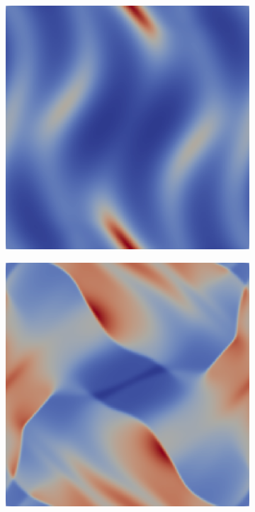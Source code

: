 \documentclass[a4paper]{article}
\begin{document}
\begin{figure}[h]
  \centering
  \begin{subfigure}[b]{0.49\textwidth}
    \centering
    \includegraphics[width=\textwidth]{results/orszag_tang05}
  \end{subfigure}
  \begin{subfigure}[b]{0.49\textwidth}
    \centering
    \includegraphics[width=\textwidth]{results/orszag_tang2}

\end{subfigure}
\end{figure}
\end{document}
